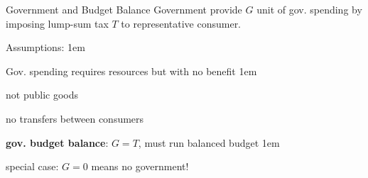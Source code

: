 \documentclass[11pt,aspectratio=43]{beamer}
\let\olditemize=\itemize
\let\endolditemize=\enditemize
\renewenvironment{itemize}{\olditemize \itemsep1em}{\endolditemize}
\let\oldenumerate=\enumerate
\let\endoldenumerate=\endenumerate
\renewenvironment{enumerate}{\oldenumerate \itemsep1em}{ \endoldenumerate}
\theoremstyle{definition}
\begin{document}
\begin{frame}{Government and Budget Balance}
\label{slide:Government_and_Budget_Balance}
    Government provide $ G $ unit of gov. spending by imposing \alert{lump-sum tax} $ T $ to representative consumer.

    Assumptions:
    \begin{enumerate}
        \item Gov. spending requires resources but with no benefit
        \begin{itemize}
            \item not \alert{public goods}
        \end{itemize}
        \item no transfers between consumers
        \item \textbf{gov. budget balance}: $ G = T $, must run balanced budget
        \begin{itemize}
            \item special case: $ G=0 $ means no government!
        \end{itemize}
    \end{enumerate}
\end{frame}
\end{document}
